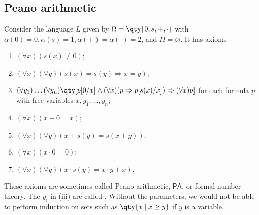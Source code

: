 \subsection{Peano arithmetic}
Consider the language $L$ given by $\Omega = \qty{0, s, +, \cdot}$ with $\alpha(0) = 0, \alpha(s) = 1, \alpha(+) = \alpha(\cdot) = 2$, and $\Pi = \varnothing$.
It has axioms
\begin{enumerate}
    \item $(\forall x)(s(x) \neq 0)$;
    \item $(\forall x)(\forall y)(s(x) = s(y) \Rightarrow x = y)$;
    \item $(\forall y_1)\dots(\forall y_n)\qty[p[0/x] \wedge (\forall x)(p \Rightarrow p[s(x)/x]) \Rightarrow (\forall x)p]$ for each formula $p$ with free variables $x, y_1, \dots, y_n$;
    \item $(\forall x)(x + 0 = x)$;
    \item $(\forall x)(\forall y)(x + s(y) = s(x + y))$;
    \item $(\forall x)(x \cdot 0 = 0)$;
    \item $(\forall x)(\forall y)(x \cdot s(y) = x \cdot y + x)$.
\end{enumerate}
These axioms are sometimes called Peano arithmetic, $\mathsf{PA}$, or formal number theory.
The $y_i$ in (iii) are called .
Without the parameters, we would not be able to perform induction on sets such as $\qty{x \mid x \geq y}$ if $y$ is a variable.

